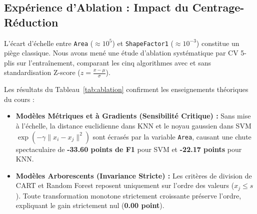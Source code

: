 \documentclass[10pt,a4paper,twocolumn]{article}
\begin{document}
\subsection{Expérience d'Ablation : Impact du Centrage-Réduction}
L'écart d'échelle entre \texttt{Area} ($\approx 10^5$) et \texttt{ShapeFactor1} ($\approx 10^{-3}$) constitue un piège classique. Nous avons mené une étude d'ablation systématique par CV 5-plis sur l'entraînement, comparant les cinq algorithmes avec et sans standardisation Z-score ($z = \frac{x-\mu}{\sigma}$).

\begin{table}[h]
\centering
\small
\caption{Résultats de l'expérience d'ablation sur la standardisation}
\label{tab:ablation}
\end{table}

Les résultats du Tableau~\ref{tab:ablation} confirment les enseignements théoriques du cours :
\begin{itemize}
    \item \textbf{Modèles Métriques et à Gradients (Sensibilité Critique) :} Sans mise à l'échelle, la distance euclidienne dans KNN et le noyau gaussien dans SVM $\exp(-\gamma \|x_i - x_j\|^2)$ sont écrasés par la variable \texttt{Area}, causant une chute spectaculaire de \textbf{-33.60 points de F1} pour SVM et \textbf{-22.17 points} pour KNN.
    \item \textbf{Modèles Arborescents (Invariance Stricte) :} Les critères de division de CART et Random Forest reposent uniquement sur l'ordre des valeurs ($x_j \le s$). Toute transformation monotone strictement croissante préserve l'ordre, expliquant le gain strictement nul (\textbf{0.00 point}).
\end{itemize}
\end{document}
